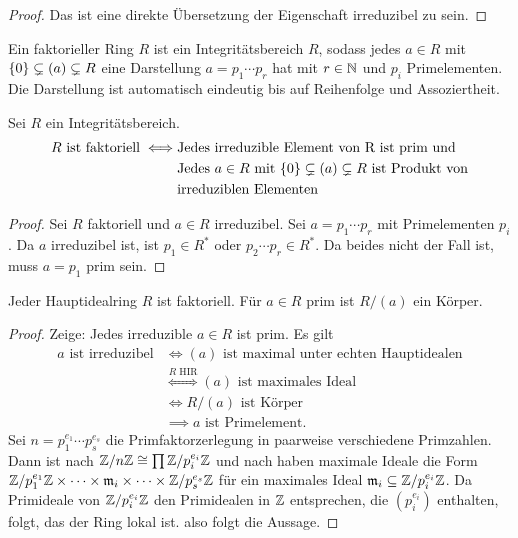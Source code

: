\begin{proof}
	Das ist eine direkte Übersetzung der Eigenschaft irreduzibel zu sein.
\end{proof}
\begin{Def}
	Ein faktorieller Ring \(R\) ist ein Integritätsbereich \(R\), sodass jedes \(a\in R\) mit \(\{0\}\subsetneq (a)\subsetneq R\) eine Darstellung \(a=p_1\cdots p_r\) hat mit \(r\in\mathbb{N}\) und \(p_i\) Primelementen. Die Darstellung ist automatisch eindeutig bis auf Reihenfolge und Assoziertheit.
\end{Def}
\begin{Lemma}
	Sei \(R\) ein Integritätsbereich. 
	\begin{align*}
		R \text{ ist faktoriell} \iff& \text{Jedes irreduzible Element von R ist prim und}\\
		& \text{Jedes \(a\in R\) mit \(\{0\}\subsetneq (a)\subsetneq R\) ist Produkt von}\\
		&\text{irreduziblen Elementen}
	\end{align*}
\end{Lemma}
\begin{proof}
	Sei \(R\) faktoriell und \(a\in R\) irreduzibel. Sei \(a=p_1\cdots p_r\) mit Primelementen \(p_i\). Da \(a\) irreduzibel ist, ist \(p_1\in R^*\) oder \(p_2\cdots p_r\in R^*\). Da beides nicht der Fall ist, muss \(a=p_1\) prim sein.
\end{proof}
\begin{Satz}
	Jeder Hauptidealring \(R\) ist faktoriell. Für \(a\in R\) prim ist \(R/(a)\) ein Körper.
\end{Satz}
\begin{proof}
	Zeige: Jedes irreduzible \(a\in R\) ist prim. Es gilt 
	\begin{align*}
		a \text{ ist irreduzibel} &\iff (a) \text{ ist maximal unter echten Hauptidealen}\\
		&\stackrel{R \text{ HIR}}\iff (a) \text{ ist maximales Ideal}\\
		&\iff R/(a) \text{ ist Körper}\\
		&\implies a \text{ ist Primelement.}
	\end{align*}
	Sei \(n=p_1^{e_1}\cdots p_s^{e_s}\) die Primfaktorzerlegung in paarweise verschiedene Primzahlen. Dann ist nach  \(\mathbb{Z}/n\mathbb{Z}\cong \prod \mathbb{Z}/p_i^{e_i}\mathbb{Z}\) und nach  haben maximale Ideale die Form \(\mathbb{Z}/p_1^{e_1}\mathbb{Z}\times\dots\times \mathfrak{m}_i\times\dots\times \mathbb{Z}/p_s^{e_s}\mathbb{Z}\) für ein maximales Ideal \(\mathfrak{m}_i \subseteq \mathbb{Z}/p_i^{e_i}\mathbb{Z}\).
	Da Primideale von \(\mathbb{Z}/p_i^{e_i}\mathbb{Z}\) den Primidealen in \(\mathbb{Z}\) entsprechen, die \((p_i^{e_i})\) enthalten, folgt, das der Ring lokal ist. also folgt die Aussage.
\end{proof}

